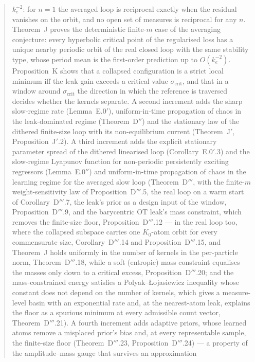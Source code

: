 \begin{abstract}
$k_e^{-2}$: for $n = 1$ the averaged loop is reciprocal exactly when the residual vanishes on the orbit, and no open
set of measures is reciprocal for any $n$. Theorem~J proves the deterministic finite-$m$ case of the averaging
conjecture: every hyperbolic critical point of the regularised loss has a unique nearby periodic orbit of the real
closed loop with the same stability type, whose period mean is the first-order prediction up to $O(k_e^{-2})$.
Proposition~K shows that a collapsed configuration is a strict local minimum iff the leak gain exceeds a critical
value $\sigma_{\mathrm{crit}}$, and that in a window around $\sigma_{\mathrm{crit}}$ the direction in which the
reference is traversed decides whether the kernels separate. A second increment adds the sharp slow-regime rate
(Lemma~E.0$'$), uniform-in-time propagation of chaos in the leak-dominated regime (Theorem~D$''$) and the stationary
law of the dithered finite-size loop with its non-equilibrium current (Theorem~J$'$, Proposition~J$'$.2). A third
increment adds the explicit stationary parameter spread of the dithered linearised loop (Corollary~E.0$'$.3) and
the slow-regime Lyapunov function for non-periodic persistently exciting regressors (Lemma~E.0$''$) and
uniform-in-time propagation of chaos in the learning regime for the averaged slow loop (Theorem~D$'''$, with the
finite-$m$ weight-sensitivity law of Proposition~D$'''$.5, the real loop on a warm start of Corollary~D$'''$.7, the
leak's prior as a design input of the window, Proposition~D$'''$.9, and the barycentric OT leak's mass constraint,
which removes the finite-size floor, Proposition~D$'''$.12 --- in the real loop too, where the collapsed subspace
carries one $K_0$-atom orbit for every commensurate size, Corollary~D$'''$.14 and Proposition~D$'''$.15, and
Theorem~J holds uniformly in the number of kernels in the per-particle norm, Theorem~D$'''$.18, while a soft
(entropic) mass constraint equalises the masses only down to a critical excess, Proposition~D$'''$.20; and the
mass-constrained energy satisfies a Polyak--{\L}ojasiewicz inequality whose constant does not depend on the number
of kernels, which gives a measure-level basin with an exponential rate and, at the nearest-atom leak, explains the
floor as a spurious minimum at every admissible count vector, Theorem~D$'''$.21). A fourth increment adds adaptive
priors, whose learned atoms remove a misplaced prior's bias and, at every representable sample, the finite-size floor
(Theorem~D$'''$.23, Proposition~D$'''$.24) --- a property of the amplitude--mass gauge that survives an approximation

\end{abstract}

